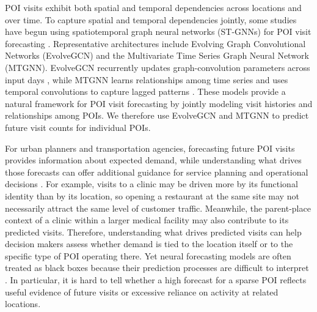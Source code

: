 \documentclass[preprint,authoryear,11pt]{elsarticle}
\def\citep#1{}%
\theoremstyle{definition}
\begin{document}
POI visits exhibit both spatial and temporal dependencies across locations and over time.
To capture spatial and temporal dependencies jointly, some studies have begun using spatiotemporal graph neural networks (ST-GNNs) for POI visit forecasting \citep{hajisafi2023learning,zhang2026causalpoi}.
Representative architectures include Evolving Graph Convolutional Networks (EvolveGCN) and the Multivariate Time Series Graph Neural Network (MTGNN). 
EvolveGCN recurrently updates graph-convolution parameters across input days \citep{pareja2020evolvegcn}, while MTGNN learns relationships among time series and uses temporal convolutions to capture lagged patterns \citep{wu2020connecting}. 
These models provide a natural framework for POI visit forecasting by jointly modeling visit histories and relationships among POIs.
We therefore use EvolveGCN and MTGNN to predict future visit counts for individual POIs.

For urban planners and transportation agencies, forecasting future POI visits provides information about expected demand, while understanding what drives those forecasts can offer additional guidance for service planning and operational decisions \citep{hajisafi2023learning}. 
For example, visits to a clinic may be driven more by its functional identity than by its location, so opening a restaurant at the same site may not necessarily attract the same level of customer traffic. 
Meanwhile, the parent-place context of a clinic within a larger medical facility may also contribute to its predicted visits.
Therefore, understanding what drives predicted visits can help decision makers assess whether demand is tied to the location itself or to the specific type of POI operating there.
Yet neural forecasting models are often treated as black boxes because their prediction processes are difficult to interpret \citep{ribeiro2016should,lipton2018mythos}. In particular, it is hard to tell whether a high forecast for a sparse POI reflects useful evidence of future visits or excessive reliance on activity at related locations.
\end{document}

